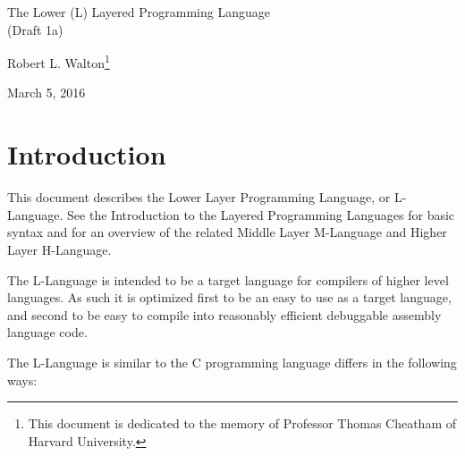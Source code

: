 \documentclass[12pt]{article}
\makeatletter
\renewcommand\tableofcontents{%
    \begin{list}{}%
	     {\setlength{\itemsep}{0in}%
	      \setlength{\topsep}{0in}%
	      \setlength{\parsep}{1ex}%
	      \setlength{\labelwidth}{0in}%
	      \setlength{\baselineskip}{1.5ex}%
	      \setlength{\leftmargin}{1.0in}%
	      \setlength{\rightmargin}{1.0in}}%
    \item\@starttoc{toc}%
    \end{list}}
\makeatother
\begin{document}
        
\begin{center}

{\Large
The Lower (L) Layered Programming Language \\[0.5ex]
(Draft 1a)}

\medskip

Robert L. Walton\footnote{This document is dedicated to the memory
of Professor Thomas Cheatham of Harvard University.}

March 5, 2016
 
\end{center}

{\small \tableofcontents}

\newpage

\section{Introduction}

This document describes the Lower Layer Programming Language, or
L-Language.  See the Introduction to the Layered
Programming Languages for basic syntax and for an overview of the related
Middle Layer M-Language and Higher Layer H-Language.

The L-Language is intended to be a target language for compilers of
higher level languages.  As such it is optimized first to be an easy to 
use as a target language, and second to be easy to
compile into reasonably efficient debuggable assembly language code.

The L-Language is similar to the C programming language
differs in the following ways:
\end{document}
